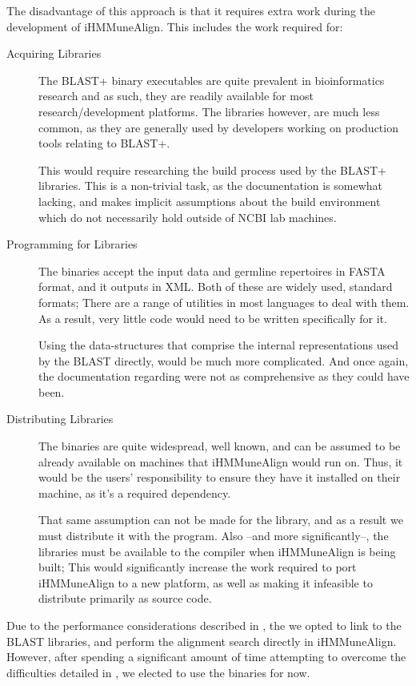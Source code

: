 The disadvantage of this approach is that it requires extra work during the development of iHMMuneAlign. This includes the work required for:
\begin{description}
	\item[Acquiring Libraries]
	The BLAST+ binary executables are quite prevalent in bioinformatics research and as such, they are readily available for most research/development platforms. The libraries however, are much less common, as they are generally used by developers working on production tools relating to BLAST+. 
	
	This would require researching the build process used by the BLAST+ libraries. This is a non-trivial task, as the documentation is somewhat lacking, and makes implicit assumptions about the build environment which do not necessarily hold outside of NCBI lab machines.
	\item[Programming for Libraries]
	The binaries accept the input data and germline repertoires in FASTA format, and it outputs in XML. Both of these are widely used, standard formats; There are a range of utilities in most languages to deal with them. As a result, very little code would need to be written specifically for it.
	
	Using the data-structures that comprise the internal representations used by the BLAST directly, would be much more complicated. And once again, the documentation regarding were not as comprehensive as they could have been.
	\item[Distributing Libraries]
	The binaries are quite widespread, well known, and can be assumed to be already available on machines that iHMMuneAlign would run on. Thus, it would be the users' responsibility to ensure they have it installed on their machine, as it's a required dependency.
	
	That same assumption can not be made for the library, and as a result we must distribute it with the program. Also --and more significantly--, the libraries must be available to the compiler when iHMMuneAlign is being built; This would significantly increase the work required to port iHMMuneAlign to a new platform, as well as making it infeasible to distribute primarily as source code.
\end{description}

Due to the performance considerations described in , the we opted to link to the BLAST libraries, and perform the alignment search directly in iHMMuneAlign. However, after spending a significant amount of time attempting to overcome the difficulties detailed in , we elected to use the binaries for now. 

